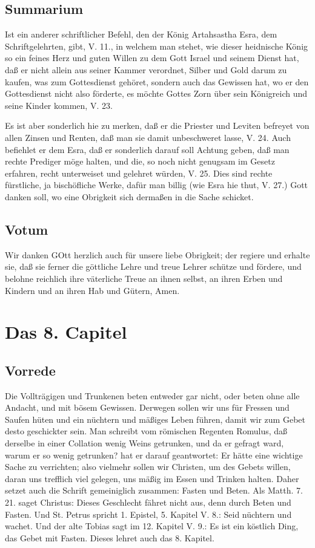 \section{Summarium}

Ist ein anderer schriftlicher Befehl, den der König Artahsastha Esra, dem Schriftgelehrten, gibt, V. 11., in welchem man stehet, wie dieser heidnische König so ein feines Herz und guten Willen zu dem Gott Israel und seinem Dienst hat, daß er nicht allein aus seiner Kammer verordnet, Silber und Gold darum zu kaufen, was zum Gottesdienst gehöret, sondern auch das Gewissen hat, wo er den Gottesdienst nicht also förderte, es möchte Gottes Zorn über sein Königreich und seine Kinder kommen, V. 23.

Es ist aber sonderlich hie zu merken, daß er die Priester und Leviten befreyet von allen Zinsen und Renten, daß man sie damit unbeschweret lasse, V. 24. Auch befiehlet er dem Esra, daß er sonderlich darauf soll Achtung geben, daß man rechte Prediger möge halten, und die, so noch nicht genugsam im Gesetz erfahren, recht unterweiset und gelehret würden, V. 25. Dies sind rechte fürstliche, ja bischöfliche Werke, dafür man billig (wie Esra hie thut, V. 27.) Gott danken soll, wo eine Obrigkeit sich dermaßen in die Sache schicket.

\section{Votum}

Wir danken GOtt herzlich auch für unsere liebe Obrigkeit; der regiere und erhalte sie, daß sie ferner die göttliche Lehre und treue Lehrer schütze und fördere, und belohne reichlich ihre väterliche Treue an ihnen selbst, an ihren Erben und Kindern und an ihren Hab und Gütern, Amen.

\chapter{Das 8. Capitel}

\section{Vorrede}

Die Vollträgigen und Trunkenen beten entweder gar nicht, oder beten ohne alle Andacht, und mit bösem Gewissen. Derwegen sollen wir uns für Fressen und Saufen hüten und ein nüchtern und mäßiges Leben führen, damit wir zum Gebet desto geschickter sein. Man schreibt vom römischen Regenten Romulus, daß derselbe in einer Collation wenig Weins getrunken, und da er gefragt ward, warum er so wenig getrunken? hat er darauf geantwortet: Er hätte eine wichtige Sache zu verrichten; also vielmehr sollen wir Christen, um des Gebets willen, daran uns trefflich viel gelegen, uns mäßig im Essen und Trinken halten. Daher setzet auch die Schrift gemeiniglich zusammen: Fasten und Beten. Als Matth. 7. 21. saget Christus: Dieses Geschlecht fähret nicht aus, denn durch Beten und Fasten. Und St. Petrus spricht 1. Epistel, 5. Kapitel V. 8.: Seid nüchtern und wachet. Und der alte Tobias sagt im 12. Kapitel V. 9.: Es ist ein köstlich Ding, das Gebet mit Fasten. Dieses lehret auch das 8. Kapitel.

